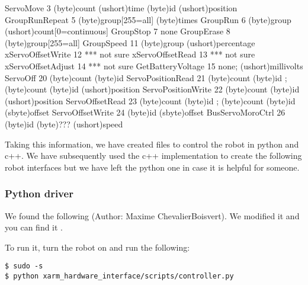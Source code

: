 \documentclass[letterpaper,10pt,english]{sphinxmanual}
\begin{document}
\begin{sphinxVerbatim}[commandchars=\\\{\}]
ServoMove             3  (byte)count (ushort)time \PYGZob{} (byte)id (ushort)position \PYGZcb{}
GroupRunRepeat        5  (byte)group[255=all] (byte)times
GroupRun              6  (byte)group (ushort)count[0=continuous]
GroupStop             7  \PYGZhy{}none\PYGZhy{}
GroupErase            8  (byte)group[255=all]
GroupSpeed           11  (byte)group (ushort)percentage
xServoOffsetWrite    12  *** not sure
xServoOffsetRead     13  *** not sure
xServoOffsetAdjust   14  *** not sure
GetBatteryVoltage    15  \PYGZhy{}none\PYGZhy{}; (ushort)millivolts
ServoOff             20  (byte)count \PYGZob{} (byte)id \PYGZcb{}
ServoPositionRead    21  (byte)count \PYGZob{} (byte)id \PYGZcb{}; (byte)count \PYGZob{} (byte)id (ushort)position \PYGZcb{}
ServoPositionWrite   22  (byte)count \PYGZob{} (byte)id (ushort)position \PYGZcb{}
ServoOffsetRead      23  (byte)count \PYGZob{} (byte)id \PYGZcb{}; (byte)count \PYGZob{} (byte)id (sbyte)offset \PYGZcb{}
ServoOffsetWrite     24  (byte)id (sbyte)offset
BusServoMoroCtrl     26  (byte)id (byte)??? (ushort)speed
\end{sphinxVerbatim}

\sphinxAtStartPar
Taking this information, we have created files to control the robot in python and c++. We have subsequently used the c++ implementation to create the following robot interfaces but we have left the python one in case it is helpful for someone.


\subsubsection{Python driver}
\label{\detokenize{user_guide/1_2_software_description:python-driver}}
\sphinxAtStartPar
We found the following  (Author: Maxime Chevalier\sphinxhyphen{}Boisvert). We modified it and you can find it .

\sphinxAtStartPar
To run it, turn the robot on and run the following:



\begin{Verbatim}[commandchars=\\\{\}]
$ sudo -s
$ python xarm_hardware_interface/scripts/controller.py
\end{Verbatim}
\end{document}
